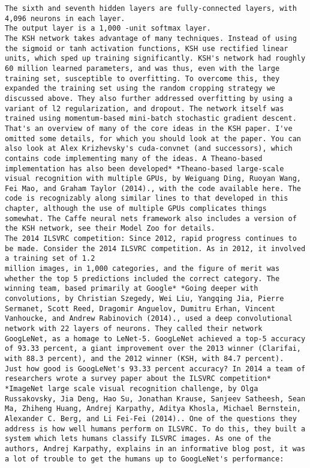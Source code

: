\begin{lstlisting}
The sixth and seventh hidden layers are fully-connected layers, with 4,096 neurons in each layer.
The output layer is a 1,000 -unit softmax layer.
The KSH network takes advantage of many techniques. Instead of using the sigmoid or tanh activation functions, KSH use rectified linear units, which sped up training significantly. KSH's network had roughly 60 million learned parameters, and was thus, even with the large training set, susceptible to overfitting. To overcome this, they expanded the training set using the random cropping strategy we discussed above. They also further addressed overfitting by using a variant of l2 regularization, and dropout. The network itself was trained using momentum-based mini-batch stochastic gradient descent.
That's an overview of many of the core ideas in the KSH paper. I've omitted some details, for which you should look at the paper. You can also look at Alex Krizhevsky's cuda-convnet (and successors), which contains code implementing many of the ideas. A Theano-based implementation has also been developed* *Theano-based large-scale visual recognition with multiple GPUs, by Weiguang Ding, Ruoyan Wang, Fei Mao, and Graham Taylor (2014)., with the code available here. The code is recognizably along similar lines to that developed in this chapter, although the use of multiple GPUs complicates things somewhat. The Caffe neural nets framework also includes a version of the KSH network, see their Model Zoo for details.
The 2014 ILSVRC competition: Since 2012, rapid progress continues to be made. Consider the 2014 ILSVRC competition. As in 2012, it involved a training set of 1.2
million images, in 1,000 categories, and the figure of merit was whether the top 5 predictions included the correct category. The winning team, based primarily at Google* *Going deeper with convolutions, by Christian Szegedy, Wei Liu, Yangqing Jia, Pierre Sermanet, Scott Reed, Dragomir Anguelov, Dumitru Erhan, Vincent Vanhoucke, and Andrew Rabinovich (2014)., used a deep convolutional network with 22 layers of neurons. They called their network GoogLeNet, as a homage to LeNet-5. GoogLeNet achieved a top-5 accuracy of 93.33 percent, a giant improvement over the 2013 winner (Clarifai, with 88.3 percent), and the 2012 winner (KSH, with 84.7 percent).
Just how good is GoogLeNet's 93.33 percent accuracy? In 2014 a team of researchers wrote a survey paper about the ILSVRC competition* *ImageNet large scale visual recognition challenge, by Olga Russakovsky, Jia Deng, Hao Su, Jonathan Krause, Sanjeev Satheesh, Sean Ma, Zhiheng Huang, Andrej Karpathy, Aditya Khosla, Michael Bernstein, Alexander C. Berg, and Li Fei-Fei (2014).. One of the questions they address is how well humans perform on ILSVRC. To do this, they built a system which lets humans classify ILSVRC images. As one of the authors, Andrej Karpathy, explains in an informative blog post, it was a lot of trouble to get the humans up to GoogLeNet's performance:

\end{lstlisting}
